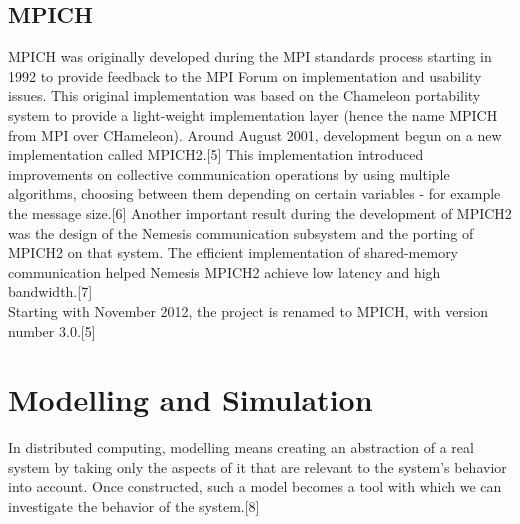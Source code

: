 \documentclass[a4paper]{article}
\begin{document}
\subsection{MPICH}
MPICH was originally developed during the MPI standards process
starting in 1992 to provide feedback to the MPI Forum on
implementation and usability issues. This original implementation was
based on the Chameleon portability system to provide a light-weight
implementation layer (hence the name MPICH from MPI over
CHameleon). Around August 2001, development begun on a new
implementation called MPICH2.[5] This implementation introduced
improvements on collective communication operations by using multiple
algorithms, choosing between them depending on certain variables - for
example the message size.[6] Another important result during the
development of MPICH2 was the design of the Nemesis communication
subsystem and the porting of MPICH2 on that system. The efficient
implementation of shared-memory communication helped Nemesis MPICH2
achieve low latency and high bandwidth.[7]\\
Starting with November 2012, the project is renamed to MPICH, with
version number 3.0.[5]
\section{Modelling and Simulation}
In distributed computing, modelling means creating an abstraction of a
real system by taking only the aspects of it that are relevant to the
system's behavior into account. Once constructed, such a model becomes
a tool with which we can investigate the behavior of the system.[8]
\end{document}

